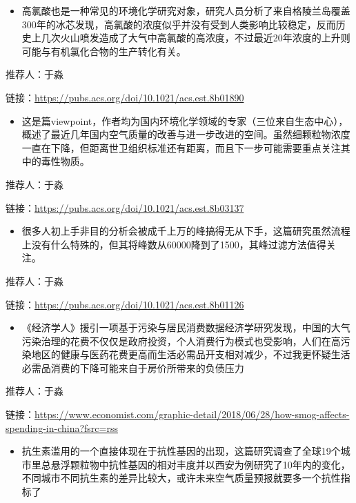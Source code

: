 \documentclass[]{book}
\providecommand{\tightlist}{%
  \setlength{\itemsep}{0pt}\setlength{\parskip}{0pt}}
\begin{document}
\begin{itemize}
\tightlist
\item
  高氯酸也是一种常见的环境化学研究对象，研究人员分析了来自格陵兰岛覆盖300年的冰芯发现，高氯酸的浓度似乎并没有受到人类影响比较稳定，反而历史上几次火山喷发造成了大气中高氯酸的高浓度，不过最近20年浓度的上升则可能与有机氯化合物的生产转化有关。
\end{itemize}

推荐人：于淼

链接：\url{https://pubs.acs.org/doi/10.1021/acs.est.8b01890}

\begin{itemize}
\tightlist
\item
  这是篇viewpoint，作者均为国内环境化学领域的专家（三位来自生态中心），概述了最近几年国内空气质量的改善与进一步改进的空间。虽然细颗粒物浓度一直在下降，但距离世卫组织标准还有距离，而且下一步可能需要重点关注其中的毒性物质。
\end{itemize}

推荐人：于淼

链接：\url{https://pubs.acs.org/doi/10.1021/acs.est.8b03137}

\begin{itemize}
\tightlist
\item
  很多人初上手非目的分析会被成千上万的峰搞得无从下手，这篇研究虽然流程上没有什么特殊的，但其将峰数从60000降到了1500，其峰过滤方法值得关注。
\end{itemize}

推荐人：于淼

链接：\url{https://pubs.acs.org/doi/10.1021/acs.est.8b01126}

\begin{itemize}
\tightlist
\item
  《经济学人》援引一项基于污染与居民消费数据经济学研究发现，中国的大气污染治理的花费不仅仅是政府投资，个人消费行为模式也受影响，人们在高污染地区的健康与医药花费更高而生活必需品开支相对减少，不过我更怀疑生活必需品消费的下降可能来自于房价所带来的负债压力
\end{itemize}

推荐人：于淼

链接：\url{https://www.economist.com/graphic-detail/2018/06/28/how-smog-affects-spending-in-china?fsrc=rss}

\begin{itemize}
\tightlist
\item
  抗生素滥用的一个直接体现在于抗性基因的出现，这篇研究调查了全球19个城市里总悬浮颗粒物中抗性基因的相对丰度并以西安为例研究了10年内的变化，不同城市不同抗生素的差异比较大，或许未来空气质量预报就要多一个抗性指标了
\end{itemize}
\end{document}
